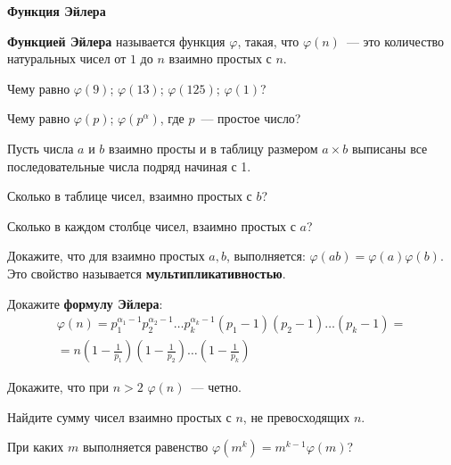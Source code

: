 \documentclass{article}
\begin{document}
    \large

    \begin{center}
        \textbf{Функция Эйлера}
    \end{center}

    \begin{definition}
        \textbf{Функцией Эйлера} называется функция $\varphi$, такая, что $\varphi(n)$~--- это количество натуральных чисел от $1$ до $n$ взаимно простых с $n$.
    \end{definition}

    \begin{enumerate_boxed}

        \item Чему равно $\varphi(9)$; $\varphi(13)$; $\varphi(125)$; $\varphi(1)$?

        \item Чему равно $\varphi(p)$; $\varphi(p^\alpha)$, где $p$~--- простое число?

        Пусть числа $a$ и $b$ взаимно просты и в таблицу размером $a \times b$ выписаны все последовательные числа подряд начиная с 1.

        \item Сколько в таблице чисел, взаимно простых с $b$?
        \item Сколько в каждом столбце чисел, взаимно простых с $a$?
        \item Докажите, что для взаимно простых $a, b$, выполняется: $\varphi(ab) = \varphi(a)\varphi(b)$.
        Это свойство называется \textbf{мультипликативностью}.
        \item Докажите \textbf{формулу Эйлера}:
        \begin{align*}
            \varphi(n) = p_1^{\alpha_1 - 1}p_2^{\alpha_2 - 1}\ldots p_k^{\alpha_k - 1}(p_1 - 1)(p_2 - 1)\ldots (p_k - 1) =\\
            = n\left(1 - \frac{1}{p_1}\right)\left(1 - \frac{1}{p_2}\right)\ldots\left(1 - \frac{1}{p_k}\right)
        \end{align*}

        \item Докажите, что при $n > 2$ $\varphi(n)$~--- четно.

        \item Найдите сумму чисел взаимно простых с $n$, не превосходящих $n$.

        \item При каких $m$ выполняется равенство $\varphi(m^k) = m^{k - 1} \varphi(m)$?


\end{enumerate_boxed}
\end{document}
